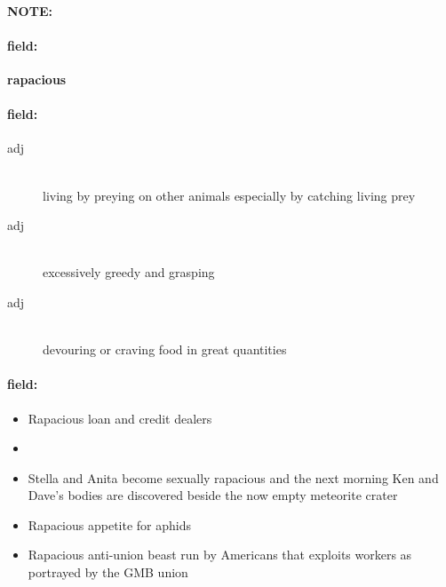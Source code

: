 \documentclass[12pt]{article}
\newenvironment{note}{\paragraph{NOTE:}}{}
\newenvironment{field}{\paragraph{field:}}{}
\begin{document}
\begin{note}
\begin{field}
\textbf{\large rapacious}
\end{field}


\begin{field}
\begin{description}
\item[adj] \hfill \\ 
living by preying on other animals especially by catching living prey

\item[adj] \hfill \\ 
excessively greedy and grasping

\item[adj] \hfill \\ 
devouring or craving food in great quantities

\end{description}
\end{field}

\begin{field}
\begin{itemize}
\item Rapacious loan and credit dealers
\item 
\item Stella and Anita become sexually rapacious and the next morning Ken and Dave's bodies are discovered beside the now empty meteorite crater
\item Rapacious appetite for aphids
\item Rapacious anti-union beast run by Americans that exploits workers as portrayed by the GMB union
\end{itemize}
\end{field}
\end{note}
\end{document}
